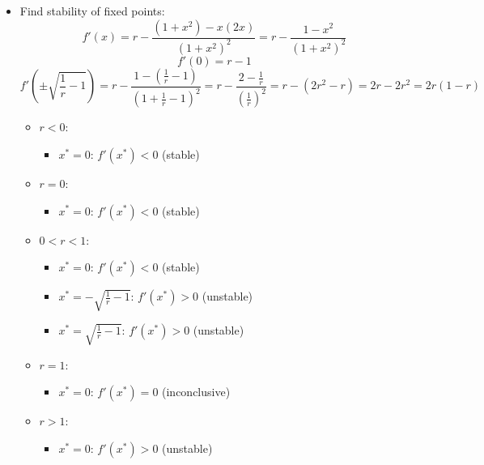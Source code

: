 \documentclass[11pt]{article}
\begin{document}
\begin{enumerate}
\begin{itemize}
\begin{itemize}
            \item $r<0$: One fixed point $x^* = 0$
            \item $0<r<1$: Three fixed points $x^* = 0,\quad x^* = \pm\sqrt{\frac{1}{r}-1}$
            \item $r>1$: One fixed point $x^* = 0$
        \end{itemize}
        \item Find stability of fixed points:
        \[f'(x) = r-\frac{(1+x^2)-x(2x)}{(1+x^2)^2} = r - \frac{1-x^2 }{(1+x^2)^2}\]
        \[f'(0) = r-1\]
        \[f'\left(\pm\sqrt{\frac{1}{r}-1}\right) 
        = r - \frac{1-\left(\frac{1}{r}-1\right)}{\left(1+\frac{1}{r}-1\right)^2} 
        = r - \frac{2-\frac{1}{r}}{\left(\frac{1}{r}\right)^2} 
        = r - (2r^2 -r) = 2r - 2r^2 = 2r(1-r)\]
        \begin{itemize}
            \item $r<0$: 
            \begin{itemize}
                \item $x^* = 0$: $f'(x^*)<0$ (stable)
            \end{itemize}
            \item $r=0$:
            \begin{itemize}
                \item $x^* = 0$: $f'(x^*)<0$ (stable)
            \end{itemize}
            \item $0<r<1$:
            \begin{itemize}
                \item $x^* = 0$: $f'(x^*)<0$ (stable)
                \item $x^* = -\sqrt{\frac{1}{r}-1}$: $f'(x^*)>0$ (unstable)
                \item $x^* = \sqrt{\frac{1}{r}-1}$: $f'(x^*)>0$ (unstable)
            \end{itemize}
            \item $r=1$:
            \begin{itemize}
                \item $x^* = 0$: $f'(x^*)=0$ (inconclusive)
            \end{itemize}
            \item $r>1$:
            \begin{itemize}
                \item $x^* = 0$: $f'(x^*)>0$ (unstable)
            \end{itemize}
        \end{itemize}

\end{itemize}
\end{enumerate}
\end{document}

